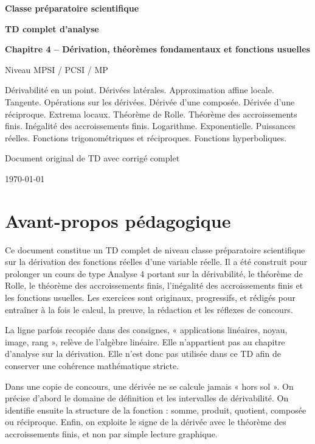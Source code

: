 \documentclass[11pt,a4paper]{article}
\begin{document}
\begin{titlepage}
\centering
\vspace*{1cm}
{\Large\bfseries Classe préparatoire scientifique}\par
\vspace{0.4cm}
{\Huge\bfseries TD complet d'analyse}\par
\vspace{0.25cm}
{\LARGE\bfseries Chapitre 4 -- Dérivation, théorèmes fondamentaux et fonctions usuelles}\par
\vspace{0.7cm}
{\large Niveau MPSI / PCSI / MP}\par
\vfill
\begin{tcolorbox}[colframe=bleuprepa,colback=blue!3!white,width=0.86\textwidth,title=Programme travaillé]
Dérivabilité en un point.
Dérivées latérales.
Approximation affine locale.
Tangente.
Opérations sur les dérivées.
Dérivée d'une composée.
Dérivée d'une réciproque.
Extrema locaux.
Théorème de Rolle.
Théorème des accroissements finis.
Inégalité des accroissements finis.
Logarithme.
Exponentielle.
Puissances réelles.
Fonctions trigonométriques et réciproques.
Fonctions hyperboliques.
\end{tcolorbox}
\vfill
{\large Document original de TD avec corrigé complet}\par
{\large \today}\par
\end{titlepage}
\tableofcontents
\newpage
\section*{Avant-propos pédagogique}
Ce document constitue un TD complet de niveau classe préparatoire scientifique sur la dérivation des fonctions réelles d'une variable réelle.
Il a été construit pour prolonger un cours de type Analyse 4 portant sur la dérivabilité, le théorème de Rolle, le théorème des accroissements finis, l'inégalité des accroissements finis et les fonctions usuelles.
Les exercices sont originaux, progressifs, et rédigés pour entraîner à la fois le calcul, la preuve, la rédaction et les réflexes de concours.
\begin{attentionbox}
La ligne parfois recopiée dans des consignes, « applications linéaires, noyau, image, rang », relève de l'algèbre linéaire.
Elle n'appartient pas au chapitre d'analyse sur la dérivation.
Elle n'est donc pas utilisée dans ce TD afin de conserver une cohérence mathématique stricte.
\end{attentionbox}
\begin{methodebox}
Dans une copie de concours, une dérivée ne se calcule jamais « hors sol ».
On précise d'abord le domaine de définition et les intervalles de dérivabilité.
On identifie ensuite la structure de la fonction : somme, produit, quotient, composée ou réciproque.
Enfin, on exploite le signe de la dérivée avec le théorème des accroissements finis, et non par simple lecture graphique.
\end{methodebox}
\newpage
\end{document}
